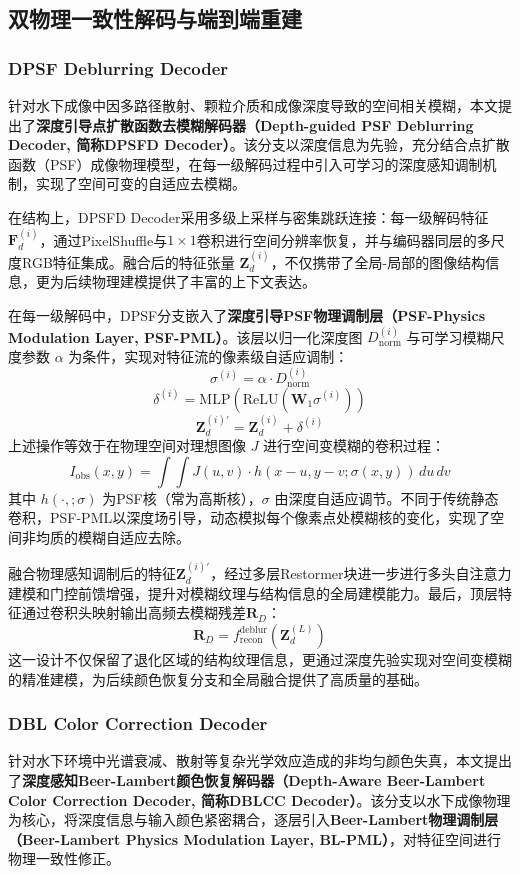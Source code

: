 \documentclass[twocolumn]{article}
\begin{document}
\subsection{双物理一致性解码与端到端重建}

\subsubsection{DPSF Deblurring Decoder}
针对水下成像中因多路径散射、颗粒介质和成像深度导致的空间相关模糊，本文提出了\textbf{深度引导点扩散函数去模糊解码器（Depth-guided PSF Deblurring Decoder, 简称DPSFD Decoder）}。该分支以深度信息为先验，充分结合点扩散函数（PSF）成像物理模型，在每一级解码过程中引入可学习的深度感知调制机制，实现了空间可变的自适应去模糊。

在结构上，DPSFD Decoder采用多级上采样与密集跳跃连接：每一级解码特征 $\mathbf{F}_d^{(i)}$，通过PixelShuffle与$1\times1$卷积进行空间分辨率恢复，并与编码器同层的多尺度RGB特征集成。融合后的特征张量 $\mathbf{Z}_d^{(i)}$，不仅携带了全局-局部的图像结构信息，更为后续物理建模提供了丰富的上下文表达。

在每一级解码中，DPSF分支嵌入了\textbf{深度引导PSF物理调制层（PSF-Physics Modulation Layer, PSF-PML）}。该层以归一化深度图 $D_{\mathrm{norm}}^{(i)}$ 与可学习模糊尺度参数 $\alpha$ 为条件，实现对特征流的像素级自适应调制：
\[
\sigma^{(i)} = \alpha \cdot D_{\mathrm{norm}}^{(i)}
\]
\[
\delta^{(i)} = \mathrm{MLP}\left(\mathrm{ReLU}\left(\mathbf{W}_1 \sigma^{(i)}\right)\right)
\]
\[
\mathbf{Z}_d^{(i)'} = \mathbf{Z}_d^{(i)} + \delta^{(i)}
\]
上述操作等效于在物理空间对理想图像 $J$ 进行空间变模糊的卷积过程：
\[
I_{\mathrm{obs}}(x, y) = \int\int J(u, v) \cdot h(x-u, y-v; \sigma(x, y))\, du\, dv
\]
其中 $h(\cdot,;\sigma)$ 为PSF核（常为高斯核），$\sigma$ 由深度自适应调节。不同于传统静态卷积，PSF-PML以深度场引导，动态模拟每个像素点处模糊核的变化，实现了空间非均质的模糊自适应去除。

融合物理感知调制后的特征$\mathbf{Z}_d^{(i)'}$，经过多层Restormer块进一步进行多头自注意力建模和门控前馈增强，提升对模糊纹理与结构信息的全局建模能力。最后，顶层特征通过卷积头映射输出高频去模糊残差$\mathbf{R}_D$：
\[
\mathbf{R}_D = f_{\mathrm{recon}}^{\mathrm{deblur}}\left(\mathbf{Z}_d^{(L)}\right)
\]
这一设计不仅保留了退化区域的结构纹理信息，更通过深度先验实现对空间变模糊的精准建模，为后续颜色恢复分支和全局融合提供了高质量的基础。

\subsubsection{DBL Color Correction Decoder}
针对水下环境中光谱衰减、散射等复杂光学效应造成的非均匀颜色失真，本文提出了\textbf{深度感知Beer-Lambert颜色恢复解码器（Depth-Aware Beer-Lambert Color Correction Decoder, 简称DBLCC Decoder）}。该分支以水下成像物理为核心，将深度信息与输入颜色紧密耦合，逐层引入\textbf{Beer-Lambert物理调制层（Beer-Lambert Physics Modulation Layer, BL-PML）}，对特征空间进行物理一致性修正。
\end{document}
